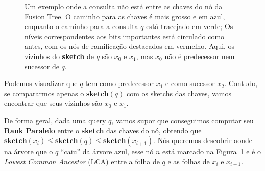 \begin{figure}[h]
\caption{Um exemplo onde a consulta não está entre as chaves do nó da Fusion
Tree. O caminho para as chaves é mais grosso e em azul, enquanto o caminho para
a consulta $q$ está tracejado em verde; Os níveis correspondentes aos bits
importantes está circulado como antes, com os nós de ramificação destacados em
vermelho. Aqui, os vizinhos do \textbf{sketch} de $q$ são $x_0$ e $x_1$, mas
$x_0$ não é predecessor nem sucessor de $q$.\label{f:fusion-query-search}}
\end{figure}

Podemos visualizar que $q$ tem como predecessor $x_1$ e como sucessor $x_2$.
Contudo, se compararmos apenas o \textbf{sketch}$(q)$ com os sketchs das chaves,
vamos encontrar que seus vizinhos são $x_0$ e $x_1$.

\enlargethispage{-4\baselineskip}

De forma geral, dada uma query $q$, vamos supor que conseguimos computar seu
\textbf{Rank Paralelo} entre o \textbf{sketch} das chaves do nó, obtendo que
$\textbf{sketch}(x_i)\leq \textbf{sketch}(q) \leq \textbf{sketch}(x_{i+1})$. Nós
queremos descobrir aonde na árvore que o $q$ ``caiu'' da árvore azul, esse nó
$n$ está marcado na Figura~\ref{f:fusion-query-search} e é o \textit{Lowest
Common Ancestor} (LCA) entre a folha de $q$ e as folhas de $x_i$ e $x_{i+1}$.

